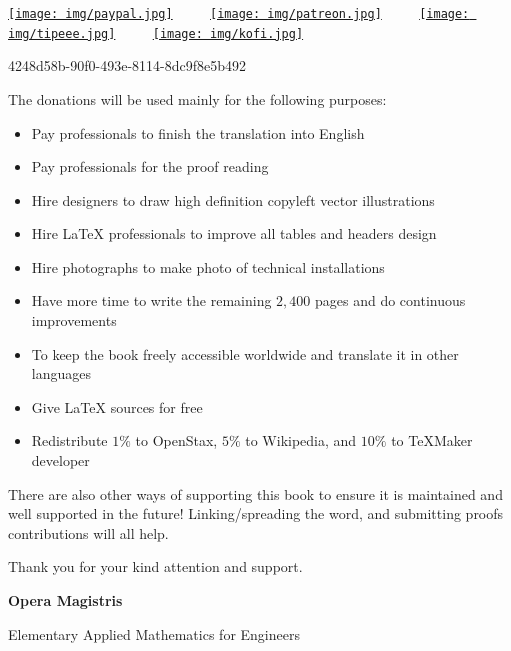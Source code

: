 \documentclass[12pt,a4paper,twoside,openright]{report}
\newcounter{def}
\theoremstyle{definition}
\theoremstyle{itexmp}
\numberwithin{equation}{section}
\begin{document}
	\begin{center}
	\href{http://www.sciences.ch/htmlfr/donate.php}{\texttt{[image: img/paypal.jpg]}} $\qquad$ \href{https://www.patreon.com/sciences}{\texttt{[image: img/patreon.jpg]}} $\qquad$ \href{https://www.tipeee.com/elements-of-applied-mathematics}{\texttt{[image: img/tipeee.jpg]}} $\qquad$ \href{http://ko-fi.com/operamagistris}{\texttt{[image: img/kofi.jpg]}}
	\end{center}
	\begin{center}
		{\large \faBitcoin} 4248d58b-90f0-493e-8114-8dc9f8e5b492
	\end{center}
	The donations will be used mainly for the following purposes:
	\begin{itemize}
		\item Pay professionals to finish the translation into English
		\item Pay professionals for the proof reading
		\item Hire designers to draw high definition copyleft vector illustrations
		\item Hire \LaTeX{} professionals to improve all tables and headers design
		\item Hire photographs to make photo of technical installations
		\item Have more time to write the remaining $2,400$ pages and do continuous improvements
		\item To keep the book freely accessible worldwide and translate it in other languages
		\item Give \LaTeX{} sources for free
		\item Redistribute $1\%$ to OpenStax, $5\%$ to Wikipedia, and $10\%$ to TeXMaker developer
	\end{itemize}
	There are also other ways of supporting this book to ensure it is maintained and well supported in the future! Linking/spreading the word, and submitting proofs contributions will all help.
	
	Thank you for your kind attention and support.
	
	\newpage\null\thispagestyle{empty}\newpage %
	\pagestyle{empty}
	\pagecolor{gray}
	{\Huge \textbf{Opera Magistris}}
	
	{\LARGE Elementary Applied Mathematics for Engineers}
\end{document}
